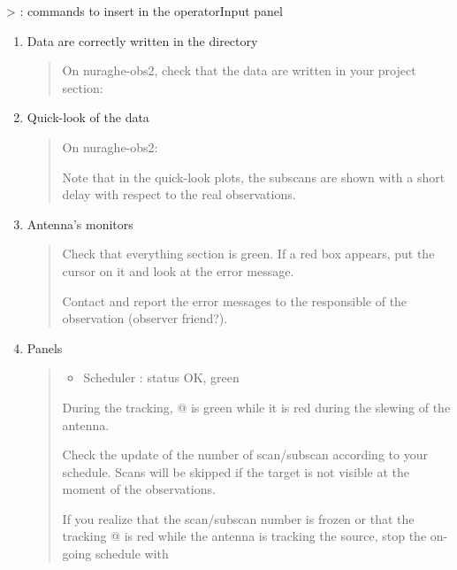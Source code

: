 \documentclass[letterpaper,10pt,english]{sphinxmanual}
\begin{document}
\textgreater{} : commands to insert in the operatorInput panel
\begin{enumerate}
\item {} 
Data are correctly written in the directory
\begin{quote}

On nuraghe-obs2, check that the data are written in your project section:

\end{quote}

\item {} 
Quick-look of the data
\begin{quote}

On nuraghe-obs2:




Note that in the quick-look plots, the subscans are shown with a short delay            with respect to the real observations.
\end{quote}

\item {} 
Antenna's monitors
\begin{quote}

Check that everything section is green. If a red box appears, put the cursor on         it and look at the error message.

Contact and report the error messages to the responsible of the observation             (observer friend?).
\end{quote}

\item {} 
Panels
\begin{quote}
\begin{itemize}
\item {} 
Scheduler : status OK, green

\end{itemize}

During the tracking, @ is green while it is red during the slewing of the antenna.

Check the update of the number of scan/subscan according to your schedule. Scans will be skipped if the target is not visible at the            moment of the observations.

If you realize that the scan/subscan number is frozen or that the tracking @ is red while the antenna is tracking the source, stop the          on-going schedule with


\end{quote}
\end{enumerate}
\end{document}
